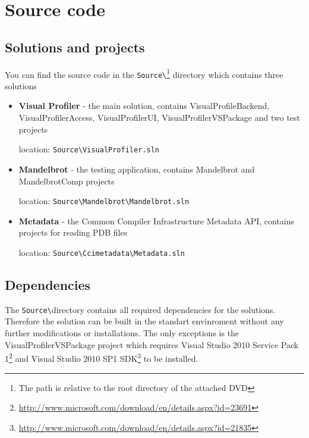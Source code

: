 \chapter{Source code}

\section{Solutions and projects}
You can find the source code in the \texttt{Source\textbackslash}\footnote{The path is relative to the root directory of the attached DVD} directory which contains three solutions
\begin{itemize}

\item \textbf{Visual Profiler} - the main solution, contains VisualProfileBackend, VisualProfilerAccess, VisualProfilerUI, VisualProfilerVSPackage and two test projects

location: \texttt{Source\textbackslash VisualProfiler.sln}\footnotemark[\value{footnote}]

\item \textbf{Mandelbrot} - the testing application, contains Mandelbrot and MandelbrotComp projects

location: \texttt{Source\textbackslash Mandelbrot\textbackslash  Mandelbrot.sln}\footnotemark[\value{footnote}]

\item \textbf{Metadata} - the Common Compiler Infrastructure Metadata API, contains projects for reading PDB files

location: \texttt{Source\textbackslash Ccimetadata\textbackslash  Metadata.sln}\footnotemark[\value{footnote}]

\end{itemize}

\section{Dependencies}
The \texttt{Source\textbackslash}\footnotemark[\value{footnote}] directory contains all required dependencies for the solutions. Therefore the solution can be built in the standart envinroment without any further modifications or installations. The only exceptions is the VisualProfilerVSPackage project which requires Visual Studio 2010 Service Pack 1\footnote{\href{http://www.microsoft.com/download/en/details.aspx?id=23691}{http://www.microsoft.com/download/en/details.aspx?id=23691}} and Visual Studio 2010 SP1 SDK\footnote{\href{http://www.microsoft.com/download/en/details.aspx?id=21835}{http://www.microsoft.com/download/en/details.aspx?id=21835}} to be installed.

